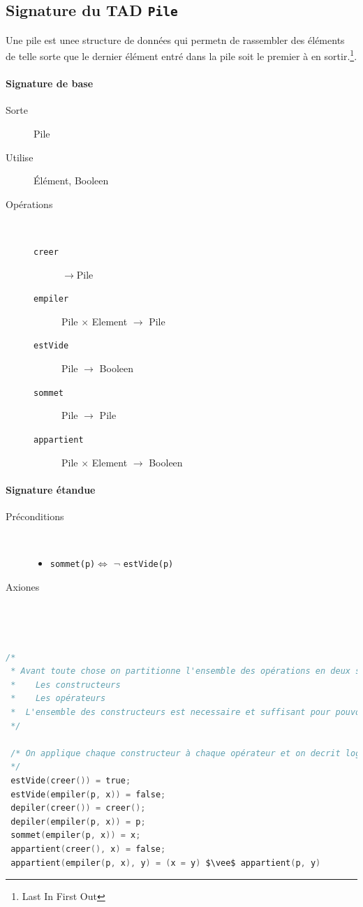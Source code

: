 \subsection{Signature du TAD \texttt{Pile}}
Une pile est unee structure de données qui permetn de rassembler des éléments de telle sorte que le dernier élément entré dans la pile soit le premier à
en sortir.\footnote{Last In First Out}.
\paragraph{Signature de base}
\begin{description}
	\item[Sorte] Pile
	\item[Utilise] Élément, Booleen 
	\item[Opérations]~ 
		\begin{description}
			\item[\texttt{creer}] $\rightarrow$Pile %
			\item[\texttt{empiler}] Pile $\times$ Element $\rightarrow$ Pile
			\item[\texttt{estVide}] Pile $\rightarrow$ Booleen  %
			\item[\texttt{sommet}] Pile $\rightarrow$ Pile
			\item[\texttt{appartient}] Pile $\times$ Element $\rightarrow$ Booleen 
		\end{description}
\end{description}

\paragraph{Signature étandue}
\begin{description}
	\item[Préconditions]~
		\begin{itemize}
			\item \texttt{sommet(p)}$\Leftrightarrow$ $\neg$ \texttt{estVide(p)}
		\end{itemize}
	\item[Axiones]~
\end{description}
~\newline
\begin{lstlisting}[language=C, numbers=none]
/* 
 * Avant toute chose on partitionne l'ensemble des opérations en deux sous ensembles : 
 *	  Les constructeurs
 *	  Les opérateurs
 *  L'ensemble des constructeurs est necessaire et suffisant pour pouvoir gagner n'importe quelle valeur de la donnée
 */

 /* On applique chaque constructeur à chaque opérateur et on decrit logiquement ce qui se passe
 */
 estVide(creer()) = true;
 estVide(empiler(p, x)) = false;
 depiler(creer()) = creer();
 depiler(empiler(p, x)) = p;
 sommet(empiler(p, x)) = x;
 appartient(creer(), x) = false;
 appartient(empiler(p, x), y) = (x = y) $\vee$ appartient(p, y)
 \end{lstlisting}

